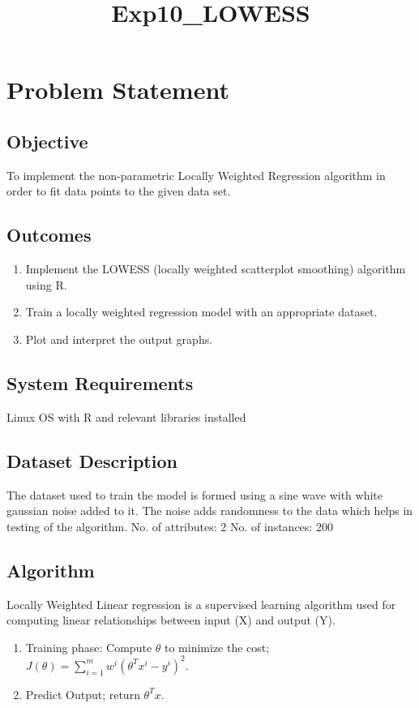 \documentclass[11pt]{article}
\title{Exp10\_LOWESS}
\begin{document}
    
    
    \maketitle
\section{Problem Statement}
\subsection{Objective}
To implement the non-parametric Locally Weighted Regression algorithm in order to fit data points to the given data set.
\subsection{Outcomes}
\begin{enumerate}
    \item Implement the LOWESS (locally weighted scatterplot smoothing) algorithm using R.
    \item Train a locally weighted regression model with an appropriate dataset.
    \item Plot and interpret the output graphs.
\end{enumerate}
\subsection{System Requirements}Linux OS with R and relevant libraries installed
\subsection{Dataset Description}
The dataset used to train the model is formed using a sine wave with white gaussian noise added to it. The noise adds randomness to the data which helps in testing of the algorithm. \newline
No. of attributes: 2 \newline
No. of instances: 200
\subsection{Algorithm}
Locally Weighted Linear regression is a supervised learning algorithm used for computing linear relationships between input (X) and output (Y).
\begin{enumerate}
    \item Training phase: Compute $\theta$ to minimize the cost; 
    $J(\theta) = \sum_{i=1}^{m}w^i(\theta^Tx^i-y^i)^2$.
    \item Predict Output; return $\theta^Tx$.
\end{enumerate}
\end{document}
